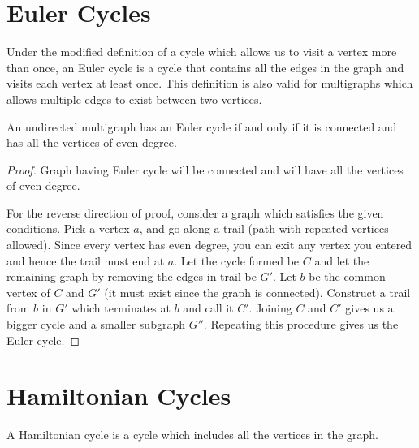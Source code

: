 \documentclass[10pt]{article}
\begin{document}
\section{Euler Cycles}

\begin{definition}
    Under the modified definition of a cycle which allows us to visit a vertex more than once, an Euler cycle is a cycle that contains all the edges in the graph and visits each vertex at least once. This definition is also valid for multigraphs which allows multiple edges to exist between two vertices.
\end{definition}

\newpage

\begin{theorem}
    An undirected multigraph has an Euler cycle if and only if it is connected and has all the vertices of even degree. 
\end{theorem}

\begin{proof}
    Graph having Euler cycle will be connected and will have all the vertices of even degree.

    For the reverse direction of proof, consider a graph which satisfies the given conditions. Pick a vertex $a$, and go along a trail (path with repeated vertices allowed). Since every vertex has even degree, you can exit any vertex you entered and hence the trail must end at $a$. Let the cycle formed be $C$ and let the remaining graph by removing the edges in trail be $G'$. Let $b$ be the common vertex of $C$ and $G'$ (it must exist since the graph is connected). Construct a trail from $b$ in $G'$ which terminates at $b$ and call it $C'$. Joining $C$ and $C'$ gives us a bigger cycle and a smaller subgraph $G''$. Repeating this procedure gives us the Euler cycle.
\end{proof}

\section{Hamiltonian Cycles}

\begin{definition}
    A Hamiltonian cycle is a cycle which includes all the vertices in the graph.
\end{definition}
\end{document}
